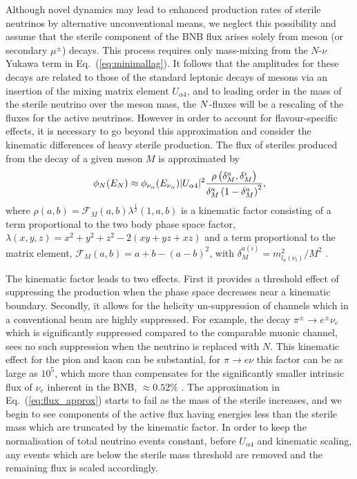 \documentclass[11pt, a4paper]{article}
\newcommand{\refeq}[1]{Eq.~(\ref{#1})}
\def\ster{\ensuremath N}
\begin{document}
%
Although novel dynamics may lead to enhanced production rates of sterile
neutrinos by alternative unconventional means, we neglect this possibility and
assume that the sterile component of the BNB flux arises solely from meson (or
secondary $\mu^\pm$) decays. This process requires only mass-mixing from the
$N$-$\nu$ Yukawa term in \refeq{eq:minimallag}. It follows that the amplitudes
for these decays are related to those of the standard leptonic decays of mesons
via an insertion of the mixing matrix element $U_{\alpha 4}$, and to leading
order in the mass of the sterile neutrino over the meson mass, the
$\ster$-fluxes will be a rescaling of the fluxes for the active neutrinos. 
%
However in order to account for flavour-specific effects, it is necessary to go
beyond this approximation and consider the kinematic differences of heavy
sterile production.
%
The flux of steriles produced from the decay of a given meson $M$ is
approximated by
%
\begin{equation} \phi_{\ster}(E_{\ster}) \approx \phi_{\nu_\alpha} (E_{\nu_\alpha})\vert
U_{\alpha 4}\vert^2 \frac{\rho\left( \delta_M^a , \delta_M^i
\right)}{\delta_M^a \left(1- \delta_M^a\right)^2}, \label{eq:flux_approx} \end{equation}
%
where $\rho(a,b)=\mathcal{F}_M(a,b) \lambda^{\frac{1}{2}}(1,a,b)$ is a
kinematic factor consisting of a term proportional to the two body phase space
factor, $\lambda(x,y,z)=x^2+y^2+z^2-2(x y+yz+x z)$ and a term proportional to
the matrix element, $\mathcal{F}_M(a,b)= a+b -\left(a-b\right)^2$, with
$\delta_M^{a(i)}=m_{l_a(\nu_i)}^2/M^2$ \cite{PhysRevD.24.1232}. 

The kinematic factor leads to two effects. First it provides a threshold effect
of suppressing the production when the phase space decreases near a kinematic
boundary.  Secondly, it allows for the helicity un-suppression of channels
which in a conventional beam are highly suppressed. For example, the decay
$\pi^\pm \to e^\pm \nu_e$ which is significantly suppressed compared to the
comparable muonic channel, sees no such suppression when the neutrino is
replaced with $N$.
%
This kinematic effect for the pion and kaon can be substantial, for $\pi
\rightarrow e \nu$ this factor can be as large as $10^5$, which more than
compensates for the significantly smaller intrinsic flux of $\nu_e$ inherent in
the BNB, $\approx 0.52$\% \cite{AguilarArevalo:2008yp}. The approximation in \refeq{eq:flux_approx}
starts to fail as the mass of the sterile increases, and we begin to
see components of the active flux having energies less than the sterile mass
which are truncated by the kinematic factor. In order to keep the normalisation
of total neutrino events constant, before $U_{\alpha 4}$ and kinematic scaling,
any events which are below the sterile mass threshold are removed and the
remaining flux is scaled accordingly.
\end{document}
